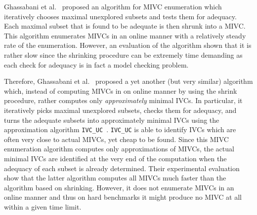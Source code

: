 Ghassabani et al.~\cite{Ghass17AllIVCs} proposed an algorithm for MIVC enumeration which iteratively chooses maximal unexplored subsets and tests them for adequacy. Each maximal subset that is found to be adequate is then shrunk into a MIVC. This algorithm enumerates MIVCs in an online manner with a relatively steady rate of the enumeration. However, an evaluation of the algorithm shown that it is rather slow since the shrinking procedure can be extremely time demanding as each check for adequacy is in fact a model checking problem. 

Therefore, Ghassabani et al.~\cite{Ghass17AllIVCs} proposed a yet another (but very similar) algorithm which, instead of computing MIVCs in on online manner by using the shrink procedure, rather computes only \emph{approximately} minimal IVCs. In particular, it iteratively picks maximal unexplored subsets, checks them for adequacy, and turns the adequate subsets into approximately minimal IVCs using the approximation algorithm \texttt{IVC\_UC}~\cite{}. \texttt{IVC\_UC} is able to identify IVCs which are often very close to actual MIVCs, yet cheap to be found. Since this MIVC enumeration algorithm computes only approximations of MIVCs, the actual minimal IVCs  are identified at the very end of the computation when the adequacy of each subset is already determined.  Their experimental evaluation show that the latter algorithm computes all MIVCs much faster than the algorithm based on shrinking. However, it does not enumerate MIVCs in an online manner and thus on hard benchmarks it might produce no MIVC at all within a given time limit. 


